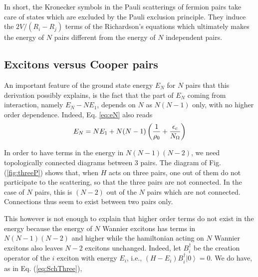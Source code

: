 \documentclass[epj]{svjour}
\begin{document}
In short, the Kronecker symbols in the Pauli scatterings of fermion pairs
take care of states which are excluded by the Pauli exclusion principle. They induce the $2V/(R_i-R_j)$ terms
of the Richardson's equations which ultimately makes the energy of $N$ pairs different
from the energy of $N$ independent pairs.

\subsection{Excitons versus Cooper pairs}

An important feature of the ground state energy $E _N$ for $N$ pairs that
this  derivation possibly explains, is the fact that the
part of $E_N$ coming from interaction, namely $E _N-N%
E _1$, depends on $N$ as $N(N-1)$ only, with no higher order dependence. Indeed, Eq. \eqref{eq:eN}  also reads
\begin{equation}  \label{eq:en}
E _N=NE _1+N(N-1)\left(\frac{1}{\rho_0} +\frac{\epsilon_c}{%
N_\Omega}\right) 
\end{equation}

In order to have terms in the energy in $N(N-1)(N-2)$, we need topologically connected
diagrams between 3 pairs. The diagram of Fig. (\ref{fig:threeP}) shows that, when $H$ acts on three pairs, one out of them do not participate to the scattering, so that the three pairs are not connected. In the case of $N$ pairs, this is $(N-2)$ out of the $N$ pairs which are not connected. Connections thus seem to exist between two pairs only. 

This however is not enough to explain that higher order terms do not exist in the energy because the energy of $N$ Wannier excitons has terms in $N(N-1)(N-2)$ and higher\cite{monicOdil}  while the hamiltonian acting on $N$ Wannier excitons  also leaves $N-2$ excitons unchanged. Indeed, let $B_i^\dagger$ be the creation operator of the $i$ exciton with energy $E_i$, i.e., $(H-E_i)B^\dagger_i\left|0\right>=0$.  We do have, as in Eq. (\ref{eq:SchThree}), 
\end{document}
